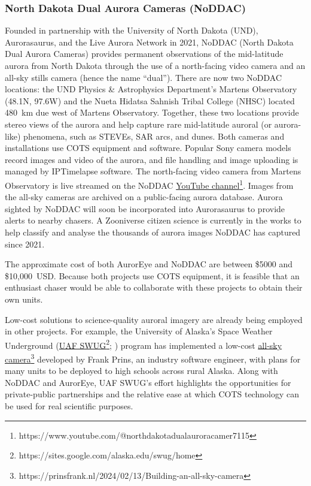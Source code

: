 \documentclass{article}
\renewcommand{\cite}[1]{\parencite{#1}}
\begin{document}
\subsubsection{North Dakota Dual Aurora Cameras (NoDDAC)}

Founded in partnership with the University of North Dakota (UND), Aurorasaurus, and the Live Aurora Network in 2021, NoDDAC (North Dakota Dual Aurora Cameras) provides permanent observations of the mid-latitude aurora from North Dakota through the use of a north-facing video camera and an all-sky stills camera (hence the name ``dual''). There are now two NoDDAC locations: the UND Physics \& Astrophysics Department's Martens Observatory (48.1\textdegree N, 97.6\textdegree W) and the Nueta Hidatsa Sahnish Tribal College (NHSC) located 480~km due west of Martens Observatory. Together, these two locations provide stereo views of the aurora and help capture rare mid-latitude auroral (or aurora-like) phenomena, such as STEVEs, SAR arcs, and dunes. Both cameras and installations use COTS equipment and software. Popular Sony camera models record images and video of the aurora, and file handling and image uploading is managed by IPTimelapse software. The north-facing video camera from Martens Observatory is live streamed on the NoDDAC \href{https://www.youtube.com/@northdakotadualauroracamer7115}{YouTube channel}\footnote{https://www.youtube.com/@northdakotadualauroracamer7115}. Images from the all-sky cameras are archived on a public-facing aurora database. Aurora sighted by NoDDAC will soon be incorporated into Aurorasaurus to provide alerts to nearby chasers. A Zooniverse citizen science is currently in the works to help classify and analyse the thousands of aurora images NoDDAC has captured since 2021.

The approximate cost of both AurorEye and NoDDAC are between \$5000 and \$10,000~USD. Because both projects use COTS equipment, it is feasible that an enthusiast chaser would be able to collaborate with these projects to obtain their own units.

Low-cost solutions to science-quality auroral imagery are already being employed in other projects. For example, the University of Alaska's Space Weather Underground (\href{https://sites.google.com/alaska.edu/swug/home}{UAF SWUG}\footnote{https://sites.google.com/alaska.edu/swug/home}; \cite{cohen2024}) program has implemented a low-cost \href{https://prinsfrank.nl/2024/02/13/Building-an-all-sky-camera}{all-sky camera}\footnote{https://prinsfrank.nl/2024/02/13/Building-an-all-sky-camera} developed by Frank Prins, an industry software engineer, with plans for many units to be deployed to high schools across rural Alaska. Along with NoDDAC and AurorEye, UAF SWUG's effort highlights the opportunities for private-public partnerships and the relative ease at which COTS technology can be used for real scientific purposes.
\end{document}
